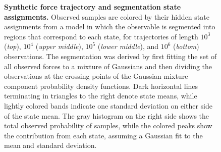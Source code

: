 \documentclass[endfloats,prl,twocolumn,superscriptaddress,nofootinbib,longbibliography]{revtex4-1}
\begin{document}
\begin{figure}[p]
\noindent
{}
\caption{{\bf Synthetic force trajectory and segmentation state assignments.}
Observed samples are colored by their hidden state assignments from a model in which the observable is segmented into regions that correspond to each state, for trajectories of length $10^3$ (\emph{top}), $10^4$ (\emph{upper middle}), $10^5$ (\emph{lower middle}), and $10^6$ (\emph{bottom}) observations.
The segmentation was derived by first fitting the set of all observed forces to a mixture of Gaussians and then dividing the observations at the crossing points of the Gaussian mixture component probability density functions.
Dark horizontal lines terminating in triangles to the right denote state means, while lightly colored bands indicate one standard deviation on either side of the state mean.
The gray histogram on the right side shows the total observed probability of samples, while the colored peaks show the contribution from each state, assuming a Gaussian fit to the mean and standard deviation.
\label{figure:model-segmentation-stateassignments}}
\end{figure}
\end{document}
